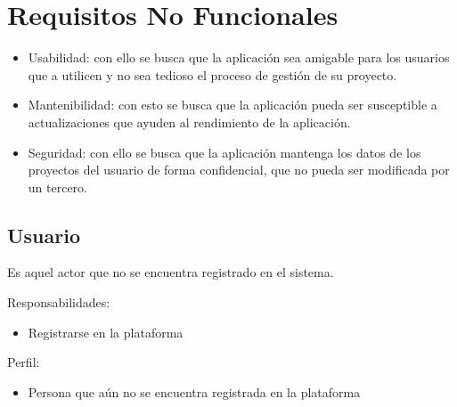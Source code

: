 \section{Requisitos No Funcionales }
\begin{itemize}
\item Usabilidad: con ello se busca que la aplicación sea amigable para los usuarios que a utilicen y no sea tedioso el proceso de gestión de su proyecto. 

\item Mantenibilidad: con esto se busca que la aplicación pueda ser susceptible a actualizaciones que ayuden al rendimiento de la aplicación. 

\item Seguridad: con ello se busca que la aplicación mantenga los datos de los proyectos del usuario de forma confidencial, que no pueda ser modificada por un tercero. 
\end{itemize}


\begin{Usuario}{\subsection{Usuario}}{
	Es aquel actor que no se encuentra registrado en el sistema. 
}
    \item[Responsabilidades:] \cdtEmpty
    \begin{itemize}
		\item Registrarse en la plataforma 
    \end{itemize}

	\item[Perfil:] \cdtEmpty
    \begin{itemize}
		\item Persona que aún no se encuentra registrada en la plataforma  
    \end{itemize}
\end{Usuario}

